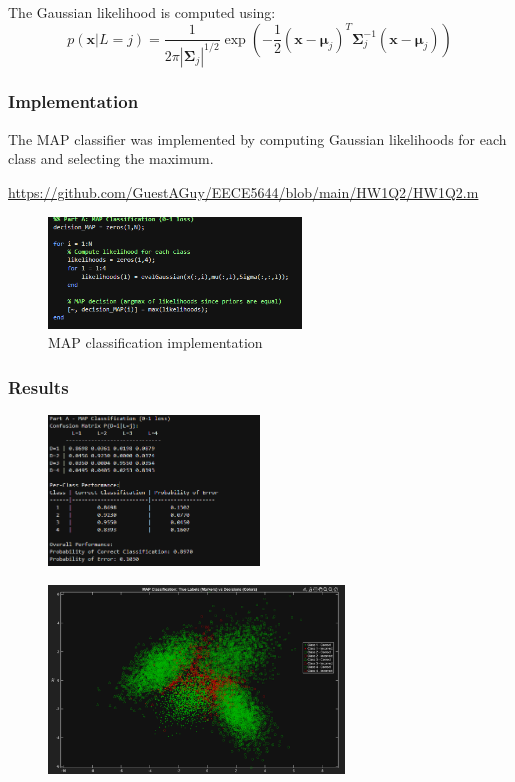 \documentclass[12pt]{article}
\begin{document}
The Gaussian likelihood is computed using:
\begin{equation}
p(\mathbf{x}|L=j) = \frac{1}{2\pi|\boldsymbol{\Sigma}_j|^{1/2}} \exp\left(-\frac{1}{2}(\mathbf{x}-\boldsymbol{\mu}_j)^T\boldsymbol{\Sigma}_j^{-1}(\mathbf{x}-\boldsymbol{\mu}_j)\right)
\end{equation}

\subsubsection{Implementation}
The MAP classifier was implemented by computing Gaussian likelihoods for each class and selecting the maximum.


\href{https://github.com/GuestAGuy/EECE5644/blob/main/HW1Q2/HW1Q2.m}{https://github.com/GuestAGuy/EECE5644/blob/main/HW1Q2/HW1Q2.m}

\begin{figure}[H]
    \centering
    \includegraphics[width=0.6\textwidth]{q2_map_code.png}
    \caption{MAP classification implementation}
\end{figure}

\subsubsection{Results}

\begin{figure}[H]
    \centering
    \includegraphics[width=0.5\textwidth]{q2_map_output.png}
\end{figure}

\begin{figure}[H]
    \centering
    \includegraphics[width=0.7\textwidth]{map_classification.png}
\end{figure}
\end{document}
